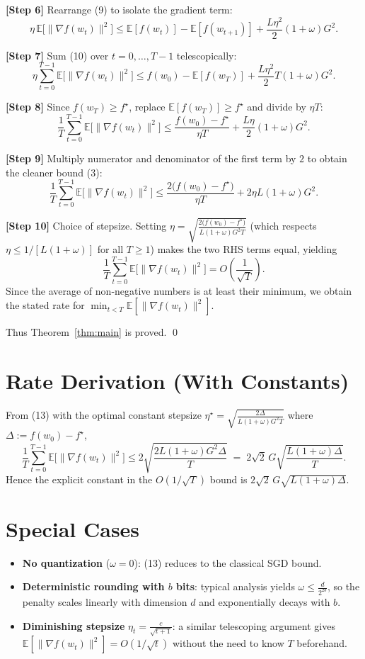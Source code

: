 \documentclass{article}
\newcommand{\EE}{\mathbb{E}}
\begin{document}
\noindent\textbf{[Step 6]} Rearrange (9) to isolate the gradient term:
\[
\eta\,\EE\!\big[\|\nabla f(w_{t})\|^{2}\big]
\le \EE[f(w_{t})]-\EE[f(w_{t+1})]
+\frac{L\eta^{2}}{2}(1+\omega)G^{2}.
\tag{10}
\]

\noindent\textbf{[Step 7]} Sum (10) over $t=0,\dots,T-1$ telescopically:
\[
\eta\sum_{t=0}^{T-1}\EE\!\big[\|\nabla f(w_{t})\|^{2}\big]
\le f(w_{0})- \EE[f(w_{T})] + \frac{L\eta^{2}}{2}T(1+\omega)G^{2}.
\tag{11}
\]

\noindent\textbf{[Step 8]} Since $f(w_{T})\ge f^{\star}$, replace $\EE[f(w_{T})]\ge f^{\star}$ and divide by $\eta T$:
\[
\frac{1}{T}\sum_{t=0}^{T-1}\EE\!\big[\|\nabla f(w_{t})\|^{2}\big]
\le \frac{f(w_{0})-f^{\star}}{\eta T}
+\frac{L\eta}{2}(1+\omega)G^{2}.
\tag{12}
\]

\noindent\textbf{[Step 9]} Multiply numerator and denominator of the first term by $2$ to obtain the cleaner bound (3):
\[
\frac{1}{T}\sum_{t=0}^{T-1}\EE\!\big[\|\nabla f(w_{t})\|^{2}\big]
\le \frac{2\big(f(w_{0})-f^{\star}\big)}{\eta T}
+2\eta L(1+\omega)G^{2}.
\tag{13}
\]

\noindent\textbf{[Step 10]} Choice of stepsize. Setting $\eta = \sqrt{\frac{2\big(f(w_{0})-f^{\star}\big)}{L(1+\omega)G^{2}T}}$ (which respects $\eta\le 1/[L(1+\omega)]$ for all $T\ge1$) makes the two RHS terms equal, yielding
\[
\frac{1}{T}\sum_{t=0}^{T-1}\EE\!\big[\|\nabla f(w_{t})\|^{2}\big]
= O\!\left(\frac{1}{\sqrt{T}}\right).
\tag{14}
\]
Since the average of non‑negative numbers is at least their minimum, we obtain the stated rate for $\min_{t<T}\EE[\|\nabla f(w_{t})\|^{2}]$.

Thus Theorem~\ref{thm:main} is proved. \qed

\section*{Rate Derivation (With Constants)}
From (13) with the optimal constant stepsize $\eta^{\star}= \sqrt{\frac{2\Delta}{L(1+\omega)G^{2}T}}$ where $\Delta:=f(w_{0})-f^{\star}$,
\[
\frac{1}{T}\sum_{t=0}^{T-1}\EE\!\big[\|\nabla f(w_{t})\|^{2}\big]
\le 2\sqrt{\frac{2L(1+\omega)G^{2}\Delta}{T}}
\;=\; 2\sqrt{2}\,G\sqrt{\frac{L(1+\omega)\Delta}{T}}.
\tag{15}
\]
Hence the explicit constant in the $O(1/\sqrt{T})$ bound is $2\sqrt{2}\,G\sqrt{L(1+\omega)\Delta}$.

\section*{Special Cases}
\begin{itemize}
\item \textbf{No quantization} ($\omega=0$): (13) reduces to the classical SGD bound.
\item \textbf{Deterministic rounding with $b$ bits}: typical analysis yields $\omega\le \frac{d}{2^{2b}}$, so the penalty scales linearly with dimension $d$ and exponentially decays with $b$.
\item \textbf{Diminishing stepsize} $\eta_{t}=\frac{c}{\sqrt{t+1}}$: a similar telescoping argument gives $\EE[\|\nabla f(w_{t})\|^{2}]=O(1/\sqrt{t})$ without the need to know $T$ beforehand.
\end{itemize}
\end{document}
